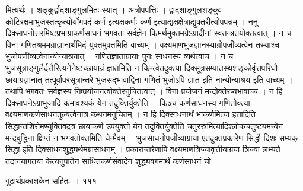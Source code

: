 \documentclass[11pt, openany]{book}
\begin{document}
\begin{sloppypar}
\noindent मित्यर्थः । शङ्कुर्द्वादशाङ्गुलमितः स्यात् । अत्रोपपत्तिः । द्वादशाङ्गुलशङ्कुः कोटिरक्षमाभुजस्तत्कृत्योर्योगपदं कर्ण इत्यक्षकर्णः कर्ण इत्याद्यक्षक्षेत्राद्युक्तरीत्योपपन्नम् । ननु दिक्साधनोत्तरमिष्टप्रभाग्राकर्णसाधनं भगवता सर्वज्ञेन किमर्थमुक्तमग्रेऽग्रादीनां स्वतन्त्रतयोक्तत्वात् । न च विना गणितश्रममग्राज्ञानार्थमिदं युक्तमुक्तमिति वाच्यम् । वक्ष्यमाणभुजज्ञानस्याग्रोपजीव्यत्वेन तस्याश्च भुजोपजीव्यत्वेनान्योन्याश्रयात् । गणितज्ञाताग्रायाः पुनः साधनस्य व्यर्थत्वाच । न च भुजसूत्राङ्गुलैर्दत्तैरित्यनेनेष्टच्छायाग्रं ज्ञातमिति न किन्त्वेतदुक्त्या दिक्सूत्रसम्पातस्थशङ्कोर्वृत्तपरिधौ छायाग्रज्ञानात् तत्पूर्वापरसूत्रान्तरे भुजसद्भावाद्विना गणितं भुजोऽपि ज्ञात इति नान्योन्याश्रय इति वाच्यम् । तथापि भगवतः सर्वज्ञस्य निष्प्रयोजनत्वोक्तेरनुचितत्वात् । विना प्रयोजनं मन्दोक्तेरप्यभावाच्च । न हि दिक्साधनेऽग्राभुजादि कमावश्यकं येन तदुक्तिर्युक्तेति । किञ्च कर्णसाधनस्य गणितोक्त्या वक्ष्यमाणकर्णसाधनतुल्यत्वेनात्र कथनमनुचितम् । न हि दिक्साधनार्थं भाकर्णमित्या हतादिति सिद्धान्तशिरोमण्युक्तिवदत्र छायाकर्ण उपयुक्तो येन तदुक्तिर्युक्तेति चतुरस्रमित्यादिश्लोकचतुष्टयमन्येन मन्दबुद्धिना क्षिप्तं न भगवतोक्तमिति चेन्मैवम् । भुजसाधनोपजीव्याग्राया एतदुक्तप्रकारेण सिद्धौ दिशः सम्यक् सिद्धा इति दिक्साधनशुद्ध्यर्थमग्रासाधनम् । प्रकारान्तरेणापि वक्ष्यमाणत्रिज्यावृत्तीयाग्रया त्रिज्या लभ्यते तदानयागतया केत्यनुपातेन साधितकर्णसंवादेन शुद्ध्यवगमार्थं कर्णसाधनं चो\textendash
\end{sloppypar}

\newpage


\hspace{3cm}  गुढार्थप्रकाशकेन सहितः~। \hfill १११
\vspace{1cm}
\end{document}
